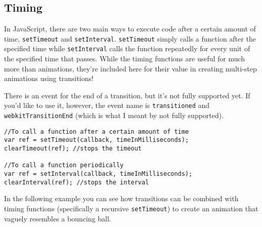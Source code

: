 \documentclass[12pt]{article}
\begin{document}
\subsection{Timing}
In JavaScript, there are two main ways to execute code after a certain amount of time, \texttt{setTimeout} and \texttt{setInterval}. \texttt{setTimeout} simply calls a function after the specified time while \texttt{setInterval} calls the function repeatedly for every unit of the specified time that passes. While the timing functions are useful for much more than animations, they're included here for their value in creating multi-step animations using transitions!
\par
There is an event for the end of a transition, but it's not fully supported yet. If you'd like to use it, however, the event name is \texttt{transitioned} and \texttt{webkitTransitionEnd} (which is what I meant by not fully supported).
\begin{Verbatim}[frame=single]
//To call a function after a certain amount of time
var ref = setTimeout(callback, timeInMilliseconds);
clearTimeout(ref); //stops the timeout

//To call a function periodically
var ref = setInterval(callback, timeInMilliseconds);
clearInterval(ref); //stops the interval
\end{Verbatim}
In the following example you can see how transitions can be combined with timing functions (specifically a recursive \texttt{setTimeout}) to create an animation that vaguely resembles a bouncing ball. 
\par
\end{document}
